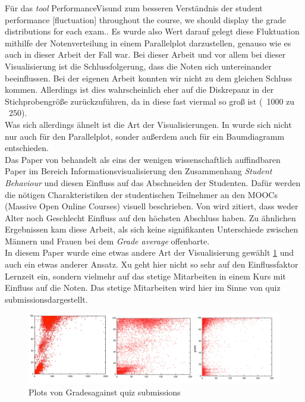 \documentclass[usegeometry=true]{scrartcl}
\begin{document}
\noindent Für das \textit{tool} \glqq PerformanceVis\grqq und zum besseren Verständnis der \glqq student performance [fluctuation] throughout the course, we should display the grade distributions for each exam.\grqq  \cite{Deng19, page: 168}. Es wurde also Wert darauf gelegt diese Fluktuation mithilfe der Notenverteilung in einem Parallelplot darzustellen, genauso wie es auch in dieser Arbeit der Fall war. Bei dieser Arbeit und vor allem bei dieser Visualisierung ist die Schlussfolgerung, dass die Noten sich untereinander beeinflussen. Bei der eigenen Arbeit konnten wir nicht zu dem gleichen Schluss kommen. Allerdings ist dies wahrscheinlich eher auf die Diskrepanz in der Stichprobengröße zurückzuführen, da in \cite{Deng19} diese fast viermal so groß ist (~1000 zu ~250).\\
Was sich allerdings ähnelt ist die Art der Visualisierungen. In \cite{Deng19} wurde sich nicht nur auch für den Parallelplot, sonder außerdem auch für ein Baumdiagramm entschieden.\\


\noindent Das Paper von \cite{Xu14} behandelt als eins der wenigen wissenschaftlich auffindbaren Paper im Bereich Informationsvisualisierung den Zusammenhang \textit{Student Behaviour} und diesen Einfluss auf das Abschneiden der Studenten. Dafür werden die nötigen Charakteristiken der studentischen Teilnehmer an den MOOCs (Massive Open Online Courses) visuell beschrieben. Von \cite{Xu14} wird zitiert, dass weder Alter noch Geschlecht Einfluss auf den höchsten Abschluss haben. Zu ähnlichen Ergebnissen kam diese Arbeit, als sich keine signifikanten Unterschiede zwischen Männern und Frauen bei dem \textit{Grade average} offenbarte.\\

\noindent In diesem Paper wurde eine etwas andere Art der Visualisierung gewählt \ref{Quelle2} und auch ein etwas anderer Ansatz. Xu geht hier nicht so sehr auf den Einflussfaktor Lernzeit ein, sondern vielmehr auf das stetige Mitarbeiten in einem Kurs mit Einfluss auf die Noten. Das stetige Mitarbeiten wird hier im Sinne von \glqq quiz submissions\grqq dargestellt.\\



\begin{figure}[h]
\begin{center}
	\includegraphics[scale=.3]{Quelle2.png}
	\caption{Plots von \glqq Grades\grqq against \glqq quiz submissions\grqq}
	\label{Quelle2}
\end{center}
\end{figure}
\end{document}
